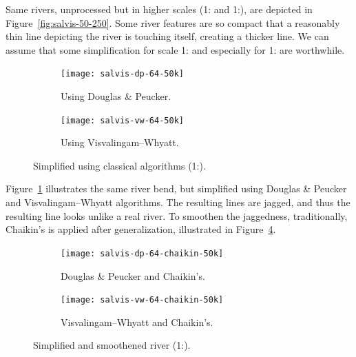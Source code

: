 \documentclass[a4paper]{article}
\newcommand{\DP}{Douglas \& Peucker}
\newcommand{\VW}{Visvalingam--Whyatt}
\begin{document}
Same rivers, unprocessed but in higher scales (1: and
1:), are depicted in Figure~\ref{fig:salvis-50-250}. Some
river features are so compact that a reasonably thin line depicting the river
is touching itself, creating a thicker line. We can assume that some
simplification for scale 1: and especially for
1: are worthwhile.

\begin{figure}[ht]
    \centering
    \begin{subfigure}[b]{.49\textwidth}
        \texttt{[image: salvis-dp-64-50k]}
        \caption{Using {\DP}.}
    \end{subfigure}
    \hfill
    \begin{subfigure}[b]{.49\textwidth}
        \texttt{[image: salvis-vw-64-50k]}
        \caption{Using {\VW}.}
    \end{subfigure}
    \caption{Simplified using classical algorithms (1:).}
    \label{fig:salvis-generalized-50k}
\end{figure}

Figure~\ref{fig:salvis-generalized-50k} illustrates the same river bend, but
simplified using {\DP} and {\VW} algorithms. The resulting lines are jagged,
and thus the resulting line looks unlike a real river. To smoothen the jaggedness,
traditionally, Chaikin's\cite{chaikin1974algorithm} is applied after
generalization, illustrated in Figure~\ref{fig:salvis-generalized-chaikin-50k}.

\begin{figure}[ht!]
    \centering
    \begin{subfigure}[b]{.49\textwidth}
        \texttt{[image: salvis-dp-64-chaikin-50k]}
        \caption{{\DP} and Chaikin's.}
        \label{fig:salvis-dp-64-chaikin-50k}
    \end{subfigure}
    \hfill
    \begin{subfigure}[b]{.49\textwidth}
        \texttt{[image: salvis-vw-64-chaikin-50k]}
        \caption{{\VW} and Chaikin's.}
        \label{fig:salvis-vw-64-chaikin-50k}
    \end{subfigure}
    \caption{Simplified and smoothened river (1:).}
    \label{fig:salvis-generalized-chaikin-50k}
\end{figure}
\end{document}
